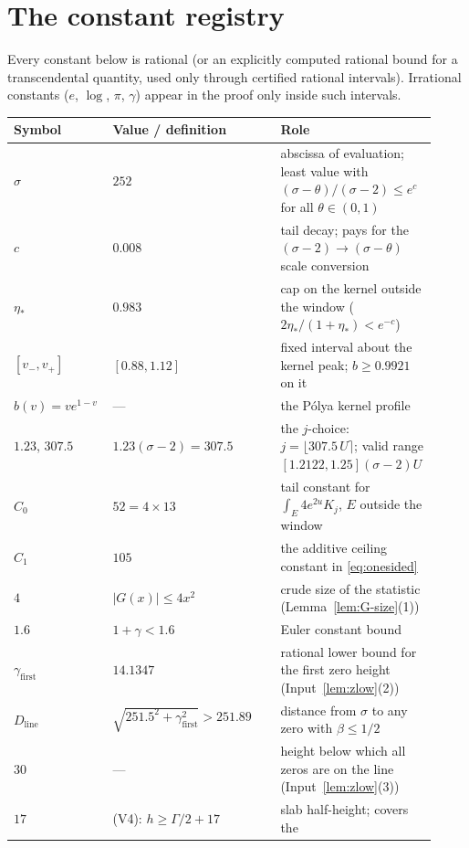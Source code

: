 \documentclass[11pt]{amsart}
\numberwithin{equation}{section}
\newcommand{\Sig}{\sigma}
\newcommand{\Euler}{\gamma}
\begin{document}
\section{The constant registry}\label{sec:registry}

Every constant below is rational (or an explicitly computed rational
bound for a transcendental quantity, used only through certified
rational intervals). Irrational constants ($e$, $\log$, $\pi$,
$\Euler$) appear in the proof only inside such intervals.

{\footnotesize
\begin{longtable}{@{}p{0.23\linewidth}p{0.39\linewidth}p{0.30\linewidth}@{}}
\hline
\textbf{Symbol} & \textbf{Value / definition} & \textbf{Role}\\
\hline
\endhead
$\Sig$ & $252$ & abscissa of evaluation; least value with
$(\Sig-\theta)/(\Sig-2) \le e^{c}$ for all $\theta \in (0,1)$\\
$c$ & $0.008$ & tail decay; pays for the $(\Sig-2) \to
(\Sig-\theta)$ scale conversion\\
$\eta_*$ & $0.983$ & cap on the kernel outside the window
($2\eta_*/(1+\eta_*) < e^{-c}$)\\
$[v_-, v_+]$ & $[0.88, 1.12]$ & fixed interval about the kernel peak;
$b \ge 0.9921$ on it\\
$b(v) = ve^{1-v}$ & --- & the P\'olya kernel profile\\
$1.23$, $307.5$ & $1.23(\Sig-2) = 307.5$ & the $j$-choice:
$j = \lfloor 307.5\,U \rceil$; valid range $[1.2122, 1.25](\Sig-2)U$\\
$C_0$ & $52 = 4 \times 13$ & tail constant for
$\int_E 4e^{2u}K_j$, $E$ outside the window\\
$C_1$ & $105$ & the additive ceiling constant in
\eqref{eq:onesided}\\
$4$ & $|G(x)| \le 4x^2$ & crude size of the statistic
(Lemma~\ref{lem:G-size}(1))\\
$1.6$ & $1 + \Euler < 1.6$ & Euler constant bound\\
$\gamma_{\mathrm{first}}$ & $14.1347$ & rational lower bound for the
first zero height (Input~\ref{lem:zlow}(2))\\
$D_{\mathrm{line}}$ & $\sqrt{251.5^2 + \gamma_{\mathrm{first}}^2}
> 251.89$ & distance from $\Sig$ to any zero with $\beta \le 1/2$\\
$30$ & --- & height below which all zeros are on the line
(Input~\ref{lem:zlow}(3))\\
$17$ & (V4): $h \ge \Gamma/2 + 17$ & slab half-height; covers the

\end{longtable}}
\end{document}
